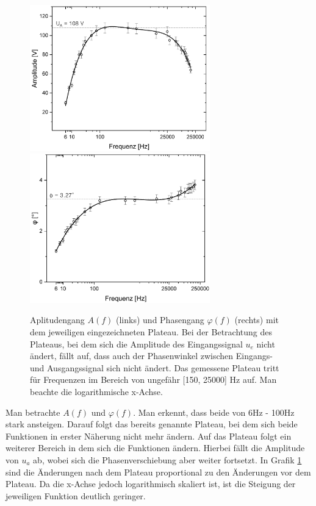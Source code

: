 \documentclass[a4paper,usenatbib]{aspdoc}
\begin{document}
            \begin{figure}
                \centering
                \includegraphics[width=78mm]{graphs/Frequenzgang1.png}
                \includegraphics[width=78mm]{graphs/Frequenzgang2.png}
                \caption{Aplitudengang $A(f)$ (links) und Phasengang $\varphi(f)$ (rechts) mit dem jeweiligen eingezeichneten Plateau. Bei der Betrachtung des Plateaus, bei dem sich die Amplitude des Eingangssignal $u_e$ nicht ändert, fällt auf, dass auch der Phasenwinkel zwischen Eingangs- und Ausgangssignal sich nicht ändert. Das gemessene Plateau tritt für Frequenzen im Bereich von ungefähr [150, 25000] Hz auf. Man beachte die logarithmische x-Achse.}
                \label{fig:freq}
            \end{figure}
            \noindent Man betrachte $A(f)$ und $\varphi(f)$. Man erkennt, dass beide von 6Hz - 100Hz stark ansteigen. Darauf folgt das bereits genannte Plateau, bei dem sich beide Funktionen in erster Näherung nicht mehr ändern. Auf das Plateau folgt ein weiterer Bereich in dem sich die Funktionen ändern. Hierbei fällt die Amplitude von $u_a$ ab, wobei sich die Phasenverschiebung aber weiter fortsetzt. In Grafik \ref{fig:freq} sind die Änderungen nach dem Plateau proportional zu den Änderungen vor dem Plateau. Da die x-Achse jedoch logarithmisch skaliert ist, ist die Steigung der jeweiligen Funktion deutlich geringer.\\
\end{document}
